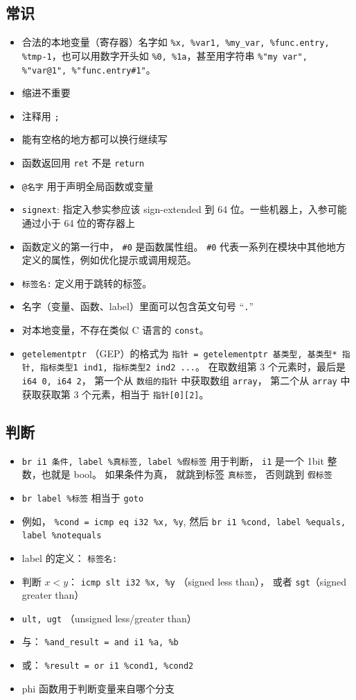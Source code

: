 \subsection{常识}
\begin{itemize}
\item 合法的本地变量（寄存器）名字如 \verb`%x, %var1, %my_var, %func.entry, %tmp-1`，也可以用数字开头如 \verb`%0, %1a`，甚至用字符串 \verb`%"my var", %"var@1", %"func.entry#1"`。
\item 缩进不重要
\item 注释用 \verb`;`
\item 能有空格的地方都可以换行继续写
\item 函数返回用 \verb`ret` 不是 \verb`return`
\item \verb`@名字` 用于声明全局函数或变量
\item \verb`signext`: 指定入参实参应该 sign-extended 到 64 位。一些机器上，入参可能通过小于 64 位的寄存器上
\item 函数定义的第一行中， \verb`#0` 是函数属性组。 \verb`#0` 代表一系列在模块中其他地方定义的属性，例如优化提示或调用规范。
\item \verb`标签名:` 定义用于跳转的标签。
\item 名字（变量、函数、label）里面可以包含英文句号 “\verb`.`”
\item 对本地变量，不存在类似 C 语言的 \verb`const`。
\item \verb`getelementptr` （GEP）的格式为 \verb`指针 = getelementptr 基类型, 基类型* 指针, 指标类型1 ind1, 指标类型2 ind2 ...`。 在取数组第 3 个元素时，最后是 \verb`i64 0, i64 2`， 第一个从 \verb`数组的指针` 中获取数组 \verb`array`， 第二个从 \verb`array` 中获取获取第 3 个元素，相当于 \verb`指针[0][2]`。
\end{itemize}

\subsection{判断}
\begin{itemize}
\item \verb`br i1 条件, label %真标签, label %假标签` 用于判断， \verb`i1` 是一个 1bit 整数，也就是 bool。 如果条件为真， 就跳到标签 \verb`真标签`， 否则跳到 \verb`假标签`
\item \verb`br label %标签` 相当于 \verb`goto`
\item 例如， \verb`%cond = icmp eq i32 %x, %y`, 然后 \verb`br i1 %cond, label %equals, label %notequals`
\item label 的定义： \verb`标签名:`
\item 判断 $x < y$： \verb`icmp slt i32 %x, %y` （signed less than）， 或者 \verb`sgt`（signed greater than）
\item \verb`ult, ugt` （unsigned less/greater than）
\item 与： \verb`%and_result = and i1 %a, %b`
\item 或： \verb`%result = or i1 %cond1, %cond2`
\item phi 函数用于判断变量来自哪个分支
\end{itemize}

